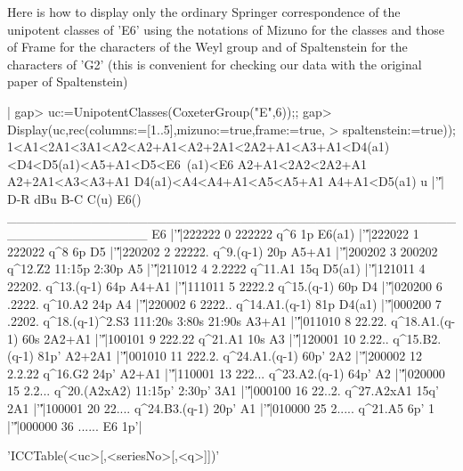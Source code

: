 Here  is how  to display  only the  ordinary Springer correspondence of the
unipotent classes of 'E6' using the notations of Mizuno for the classes and
those of Frame for the characters of the Weyl group and of Spaltenstein for
the  characters of 'G2' (this is convenient  for checking our data with the
original paper of Spaltenstein)\:

|    gap> uc:=UnipotentClasses(CoxeterGroup("E",6));;
    gap> Display(uc,rec(columns:=[1..5],mizuno:=true,frame:=true,
    > spaltenstein:=true));
    1<A1<2A1<3A1<A2<A2+A1<A2+2A1<2A2+A1<A3+A1<D4(a1)<D4<D5(a1)<A5+A1<D5<E6\
    (a1)<E6
    A2+A1<2A2<2A2+A1
    A2+2A1<A3<A3+A1
    D4(a1)<A4<A4+A1<A5<A5+A1
    A4+A1<D5(a1)
         u |'\|'|   D-R dBu    B-C            C(u)                 E6()
    _______________________________________________________________
    E6     |'\|'|222222   0 222222             q^6                   1p
    E6(a1) |'\|'|222022   1 222022             q^8                   6p
    D5     |'\|'|220202   2 22222.       q^9.(q-1)                  20p
    A5+A1  |'\|'|200202   3 200202         q^12.Z2         11:15p 2:30p
    A5     |'\|'|211012   4 2.2222         q^11.A1                  15q
    D5(a1) |'\|'|121011   4 22202.      q^13.(q-1)                  64p
    A4+A1  |'\|'|111011   5 2222.2      q^15.(q-1)                  60p
    D4     |'\|'|020200   6 .2222.         q^10.A2                  24p
    A4     |'\|'|220002   6 2222..   q^14.A1.(q-1)                  81p
    D4(a1) |'\|'|000200   7 .2202. q^18.(q-1)^2.S3 111:20s 3:80s 21:90s
    A3+A1  |'\|'|011010   8 22.22.   q^18.A1.(q-1)                  60s
    2A2+A1 |'\|'|100101   9 222.22         q^21.A1                  10s
    A3     |'\|'|120001  10 2.22..   q^15.B2.(q-1)                 81p'
    A2+2A1 |'\|'|001010  11 222.2.   q^24.A1.(q-1)                 60p'
    2A2    |'\|'|200002  12 2.2.22         q^16.G2                 24p'
    A2+A1  |'\|'|110001  13 222...   q^23.A2.(q-1)                 64p'
    A2     |'\|'|020000  15 2.2...    q^20.(A2xA2)       11:15p' 2:30p'
    3A1    |'\|'|000100  16 22..2.      q^27.A2xA1                 15q'
    2A1    |'\|'|100001  20 22....   q^24.B3.(q-1)                 20p'
    A1     |'\|'|010000  25 2.....         q^21.A5                  6p'
    1      |'\|'|000000  36 ......              E6                  1p'|

\Section{ICCTable}

'ICCTable(<uc>[,<seriesNo>[,<q>]])'

